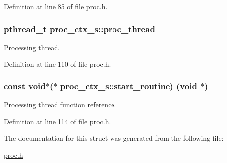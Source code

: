 Definition at line 85 of file proc.\+h.

\subsubsection[{\texorpdfstring{proc\+\_\+thread}{proc_thread}}]{\setlength{\rightskip}{0pt plus 5cm}pthread\+\_\+t proc\+\_\+ctx\+\_\+s\+::proc\+\_\+thread}\hypertarget{structproc__ctx__s_a09ad60355584215cfeb4d5589ee390b9}{}\label{structproc__ctx__s_a09ad60355584215cfeb4d5589ee390b9}
Processing thread. 

Definition at line 110 of file proc.\+h.

\subsubsection[{\texorpdfstring{start\+\_\+routine}{start_routine}}]{\setlength{\rightskip}{0pt plus 5cm}const void$\ast$($\ast$ proc\+\_\+ctx\+\_\+s\+::start\+\_\+routine) (void $\ast$)}\hypertarget{structproc__ctx__s_a1149ce1c28aae8e553c85125e30be661}{}\label{structproc__ctx__s_a1149ce1c28aae8e553c85125e30be661}
Processing thread function reference. 

Definition at line 114 of file proc.\+h.



The documentation for this struct was generated from the following file\+:\begin{DoxyCompactItemize}
\item 
\hyperlink{proc_8h}{proc.\+h}\end{DoxyCompactItemize}

